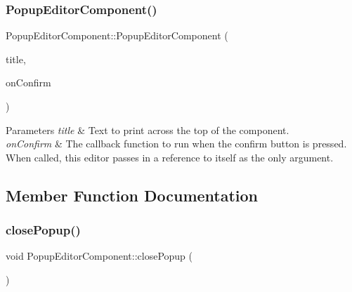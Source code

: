 \mbox{\label{classPopupEditorComponent_a44dd1d9087268253417897db476a297b}} 
\subsubsection{\texorpdfstring{Popup\+Editor\+Component()}{PopupEditorComponent()}}
{\footnotesize\ttfamily Popup\+Editor\+Component\+::\+Popup\+Editor\+Component (\begin{DoxyParamCaption}\item[{String}]{title,  }\item[{std\+::function$<$ void(\mbox{\hyperlink{classPopupEditorComponent}{Popup\+Editor\+Component}} $\ast$) $>$}]{on\+Confirm }\end{DoxyParamCaption})\hspace{0.3cm}{\ttfamily [protected]}}


\begin{DoxyParams}{Parameters}
{\em title} & Text to print across the top of the component.\\
\hline
{\em on\+Confirm} & The callback function to run when the confirm button is pressed. When called, this editor passes in a reference to itself as the only argument. \\
\hline
\end{DoxyParams}


\subsection{Member Function Documentation}
\mbox{\label{classPopupEditorComponent_ac7d85aa58f5e84956e9b2efc5c9a9795}} 
\subsubsection{\texorpdfstring{close\+Popup()}{closePopup()}}
{\footnotesize\ttfamily void Popup\+Editor\+Component\+::close\+Popup (\begin{DoxyParamCaption}{ }\end{DoxyParamCaption})}

